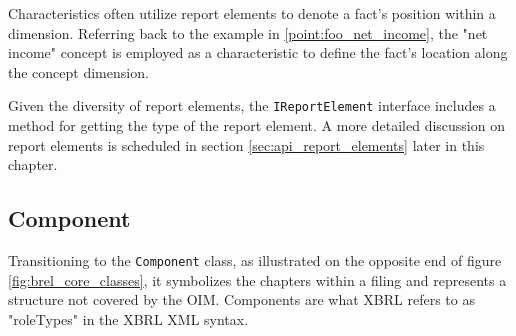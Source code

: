 Characteristics often utilize report elements to denote a fact's position within a dimension.
Referring back to the example in \ref{point:foo_net_income}, the "net income" concept is employed as a characteristic to define the fact's location along the concept dimension.


Given the diversity of report elements, the \texttt{IReportElement} interface includes a method for getting the type of the report element.
A more detailed discussion on report elements is scheduled in section \ref{sec:api_report_elements} later in this chapter.

\subsection{Component}


Transitioning to the \texttt{Component} class, as illustrated on the opposite end of figure \ref{fig:brel_core_classes}, 
it symbolizes the chapters within a filing and represents a structure not covered by the OIM.
Components are what XBRL refers to as "roleTypes" in the XBRL XML syntax.

